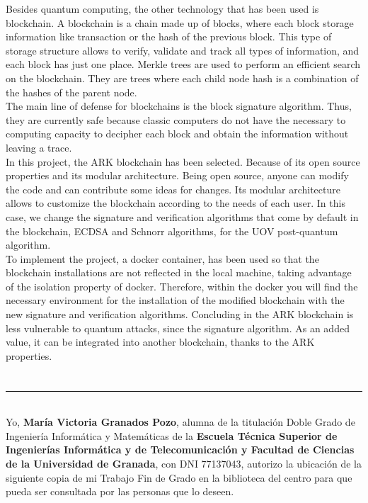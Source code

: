 Besides quantum computing, the other technology that has been used is blockchain. A blockchain is a chain made up of blocks, where each block storage information like transaction or the hash of the previous block. This type of storage structure allows to verify, validate and track all types of information, and each block has just one place. Merkle trees are used to perform an efficient search on the blockchain. They are trees where each child node hash is a combination of the hashes of the parent node.\\

The main line of defense for blockchains is the block signature algorithm. Thus, they are currently safe because classic computers do not have the necessary to computing capacity to decipher each block and obtain the information without leaving a trace.\\

In this project, the ARK blockchain has been selected. Because of its open source properties and its modular architecture. Being open source, anyone can modify the code and can contribute some ideas for changes. Its modular architecture allows to customize the blockchain according to the needs of each user. In this case, we change the signature and verification algorithms that come by default in the blockchain, ECDSA and Schnorr algorithms, for the UOV post-quantum algorithm.\\

To implement the project, a docker container, has been used so that the blockchain installations are not reflected in the local machine, taking advantage of the isolation property of docker. Therefore, within the docker you will find the necessary environment for the installation of the modified blockchain with the new signature and verification algorithms. Concluding in the ARK blockchain is less vulnerable to quantum attacks, since the signature algorithm. As an added value, it can be integrated into another blockchain, thanks to the ARK properties.\\




\chapter*{}
\thispagestyle{empty}

\noindent\rule[-1ex]{\textwidth}{2pt}\\[4.5ex]

Yo, \textbf{María Victoria Granados Pozo}, alumna de la titulación Doble Grado de Ingeniería Informática y Matemáticas de la \textbf{Escuela Técnica Superior
de Ingenierías Informática y de Telecomunicación y Facultad de Ciencias de la Universidad de Granada}, con DNI 77137043, autorizo la
ubicación de la siguiente copia de mi Trabajo Fin de Grado en la biblioteca del centro para que pueda ser
consultada por las personas que lo deseen.

